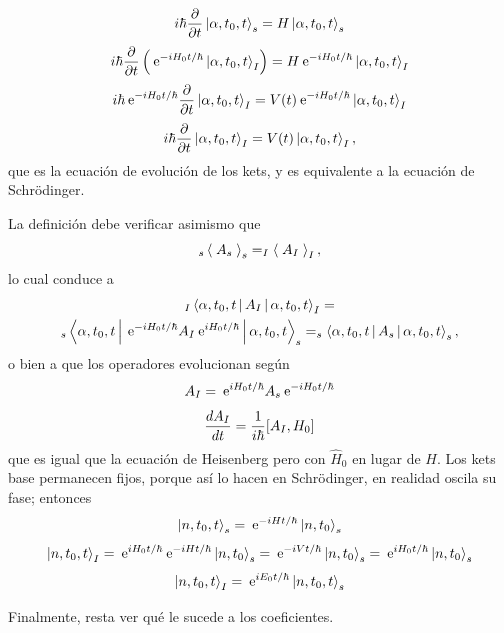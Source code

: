 \documentclass[10pt,oneside]{CBFT_book}
\begin{document}
\[
	i\hbar \frac{\partial^{\hspace{-0.05em}} {}}{\partial {t}^{\hspace{-0.05em}}}\Ket{\alpha,t_0,t}_s = H \Ket{\alpha,t_0,t}_s
\]
\[
	i\hbar \frac{\partial^{\hspace{-0.05em}} {}}{\partial {t}^{\hspace{-0.05em}}}\left( \:\mathrm{e}^{-iH_0t/\hbar}\Ket{\alpha,t_0,t}_I \right) = 
	H \:\mathrm{e}^{-iH_0t/\hbar} \Ket{\alpha,t_0,t}_I
\]
\[
	i\hbar \:\mathrm{e}^{-iH_0t/\hbar}\frac{\partial^{\hspace{-0.05em}} {}}{\partial {t}^{\hspace{-0.05em}}} \Ket{\alpha,t_0,t}_I = 
	V(t) \:\mathrm{e}^{-iH_0t/\hbar} \Ket{\alpha,t_0,t}_I
\]
\[
	i\hbar \frac{\partial^{\hspace{-0.05em}} {}}{\partial {t}^{\hspace{-0.05em}}} \Ket{\alpha,t_0,t}_I = V(t) \Ket{\alpha,t_0,t}_I,
\]
que es la ecuación de evolución de los kets, y es equivalente a la ecuación de Schrödinger.

La definición debe verificar asimismo que 
\[
	_s\Braket{\; A_s \;}_s = _I\Braket{\; A_I \;}_I,
\]
lo cual conduce a
\begin{multline*}
	_I\Braket{\alpha,t_0,t|A_I|\alpha,t_0,t}_I = \\
	_s\Braket{\alpha,t_0,t|\:\mathrm{e}^{-iH_0t/\hbar}A_I\:\mathrm{e}^{iH_0t/\hbar}|\alpha,t_0,t}_s = 
	_s\Braket{\alpha,t_0,t|A_s|\alpha,t_0,t}_s,
\end{multline*}
o bien a que los operadores evolucionan según 
\[
	A_I = \:\mathrm{e}^{iH_0t/\hbar}A_s\:\mathrm{e}^{-iH_0t/\hbar}
\]
\[
	\frac{d^{\hspace{-0.05em}} {A_I}}{d {t}^{\hspace{-0.05em}}} = \frac{1}{i\hbar}[A_I, H_0]
\]
que es igual que la ecuación de Heisenberg pero con $\hat{H}_0$ en lugar de $H$.
Los kets base permanecen fijos, porque así lo hacen en Schrödinger, en realidad oscila su fase; entonces 
\[
	\Ket{n,t_0,t}_s = \:\mathrm{e}^{-iHt/\hbar} \ket{n,t_0}_s
\]
\[
	\Ket{n,t_0,t}_I = \:\mathrm{e}^{iH_0t/\hbar} \:\mathrm{e}^{-iHt/\hbar} \ket{n,t_0}_s =
	\:\mathrm{e}^{-iVt/\hbar} \ket{n,t_0}_s = \:\mathrm{e}^{iH_0t/\hbar} \ket{n,t_0}_s
\]
\[
	\Ket{n,t_0,t}_I = \:\mathrm{e}^{iE_0t/\hbar} \ket{n,t_0,t}_s
\]

Finalmente, resta ver qué le sucede a los coeficientes.
\end{document}
